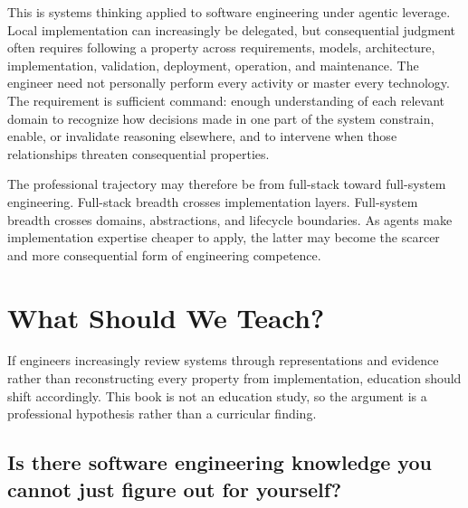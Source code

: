 
This is systems thinking applied to software engineering under agentic leverage. Local implementation can increasingly be delegated, but consequential judgment often requires following a property across requirements, models, architecture, implementation, validation, deployment, operation, and maintenance. The engineer need not personally perform every activity or master every technology. The requirement is sufficient command: enough understanding of each relevant domain to recognize how decisions made in one part of the system constrain, enable, or invalidate reasoning elsewhere, and to intervene when those relationships threaten consequential properties.


The professional trajectory may therefore be from full-stack toward full-system engineering. Full-stack breadth crosses implementation layers. Full-system breadth crosses domains, abstractions, and lifecycle boundaries. As agents make implementation expertise cheaper to apply, the latter may become the scarcer and more consequential form of engineering competence.

\section{What Should We Teach?}\label{heading:what-should-we-teach}


If engineers increasingly review systems through representations and evidence rather than reconstructing every property from implementation, education should shift accordingly. This book is not an education study, so the argument is a professional hypothesis rather than a curricular finding.

\subsection{Is there software engineering knowledge you cannot just figure out for yourself?}\label{heading:is-there-software-engineering-knowledge-you-cannot-just-figure-out-for-yourself}

